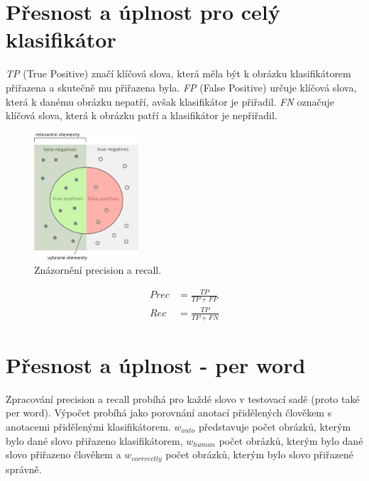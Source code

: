 \documentclass[czech,BP]{thesiskiv}
\begin{document}
\section{Přesnost a úplnost pro celý klasifikátor}
\par \textit{TP} (True Positive) značí klíčová slova, která měla být k obrázku klasifikátorem přiřazena a skutečně mu přiřazena byla. \textit{FP} (False Positive) určuje klíčová slova, která k danému obrázku nepatří, avšak klasifikátor je přiřadil. \textit{FN} označuje klíčová slova, která k obrázku patří a klasifikátor je nepřiřadil. 

\begin{multicols}{2}
	\begin{figure}[H]
		    \centering
		\includegraphics[height=180px]{./img/recall_precision.png}
		\caption{Znázornění precision a recall.}
	\end{figure}
	\begin{center}
		\begin{align}
   			\label{precision2} Prec &= \frac{TP}{TP + FP} \\[30pt]
   			\label{recall2} Rec &= \frac{TP}{TP + FN}
		\end{align}

	\end{center}
\end{multicols}

\section{Přesnost a úplnost - per word}
\par Zpracování precision a recall probíhá pro každé slovo v testovací sadě (proto také per word). Výpočet probíhá jako porovnání anotací přidělených člověkem s anotacemi přidělenými klasifikátorem. $w_{auto}$ představuje počet obrázků, kterým bylo dané slovo přiřazeno klasifikátorem, $w_{human}$ počet obrázků, kterým bylo dané slovo přiřazeno člověkem a $w_{corrrectly}$ počet obrázků, kterým bylo slovo přiřazené správně. 
\end{document}
